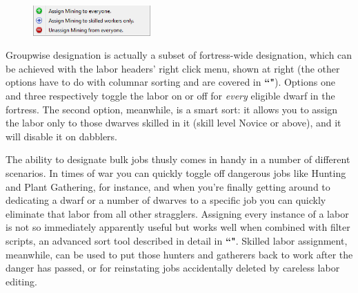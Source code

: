 \documentclass[]{article}
\begin{document}
\begin{figure}
\vspace{-20pt}
  \begin{center}
    \includegraphics[width=0.4\textwidth]{Sec2Fig5-3}
  \end{center}
\vspace{-10pt}
\end{figure}
Groupwise designation is actually a subset of fortress-wide designation, which can be achieved with the
labor headers' right click menu, shown at right (the other options have to do with columnar sorting and
are covered in \textbf{``"}). Options one and three respectively toggle the
labor on or off for \emph{every} eligible dwarf in the fortress. The second option, meanwhile, is a smart
sort: it allows you to assign the labor only to those dwarves skilled in it (skill level Novice or
above), and it will disable it on dabblers.

The ability to designate bulk jobs thusly comes in handy in a number of different scenarios. In times of
war you can quickly toggle off dangerous jobs like Hunting and Plant Gathering, for instance, and when
you're finally getting around to dedicating a dwarf or a number of dwarves to a specific job you can
quickly eliminate that labor from all other stragglers. Assigning every instance of a labor is not so
immediately apparently useful but works well when combined with filter scripts, an advanced sort tool
described in detail in \textbf{``"}. Skilled labor assignment, meanwhile, can
be used to put those hunters and gatherers back to work after the danger has passed, or for reinstating
jobs accidentally deleted by careless labor editing.
\end{document}
